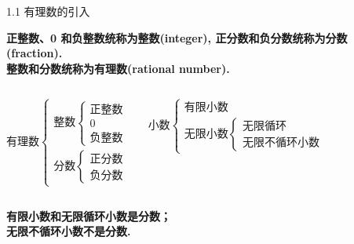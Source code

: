 \begin{frame}{1.1 有理数的引入}
\begin{definition}
\textbf{正整数、0 和负整数统称为整数(integer), 正分数和负分数统称为分数(fraction).\\
整数和分数统称为有理数(rational number).}
\end{definition}
\vspace{12pt}
\begin{columns}
\[
\mbox{有理数}\begin{cases}
\mbox{整数} \begin{cases}
    \mbox{正整数} \\
    0 \\
    \mbox{负整数}
    \end{cases} \\
\mbox{分数}  \begin{cases}
    \mbox{正分数} \\
    \mbox{负分数}
    \end{cases}
\end{cases}
\]

\[
\mbox{小数}\begin{cases}
\mbox{有限小数} \\
\mbox{无限小数} \begin{cases} 
\mbox{无限循环} \\
\mbox{无限不循环小数}
\end{cases}
\end{cases}
\]

\end{columns}
\vspace{12pt}
\textbf{有限小数和无限循环小数是分数；\\
无限不循环小数不是分数.}
\end{frame}
